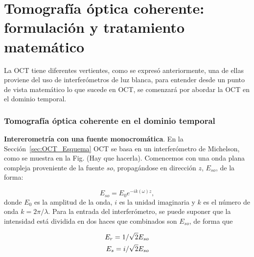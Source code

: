 \chapter[OCT: Formulación y tratamiento matemático]{Tomografía óptica coherente: formulación y tratamiento matemático}

La OCT tiene diferentes vertientes, como se expresó anteriormente, una de ellas proviene del uso de interferómetros de luz blanca, para entender desde un punto de vista matemático lo que sucede en OCT, se comenzará por abordar la OCT en el dominio temporal.

\subsection{Tomografía óptica coherente en el dominio temporal}

\textbf{Intererometría con una fuente monocromática}. En la Sección~\ref{sec:OCT_Esquema} OCT se basa en un interferómetro de Michelson, como se muestra en la Fig. (Hay que hacerla). Comencemos con una onda plana compleja proveniente de la fuente $so$, propagándose en dirección $z$, $E_{so}$, de la forma:

\begin{equation}
	E_{so} = E_0 e^{-ik(\omega)z},
\end{equation}
\noindent donde $E_0$ es la amplitud de la onda, $i$ es la unidad imaginaria y $k$ es el número de onda $k = 2\pi /\lambda$. Para la entrada del interferómetro, se puede suponer que la intensidad está dividida en dos haces que combinados son $E_{so}$, de forma que

\begin{align}
	E_r = 1/\sqrt{2} E_{so} \notag \\
	E_s = i/\sqrt{2} E_{so}
\end{align}

